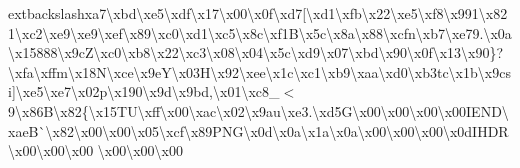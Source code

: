 \begin{DoxyCompactItemize}
extbackslash{}xa7\textbackslash{}xbd\textbackslash{}xe5\textbackslash{}xdf\textbackslash{}x17\textbackslash{}x00\textbackslash{}x0f\textbackslash{}xd7\mbox{[}\textbackslash{}xd1\textbackslash{}xfb\textbackslash{}x22\textbackslash{}xe5\textbackslash{}xf8\textbackslash{}x991\textbackslash{}x821\textbackslash{}xc2\textbackslash{}xe9\textbackslash{}xe9\textbackslash{}xef\textbackslash{}x89\textbackslash{}xc0\textbackslash{}xd1\textbackslash{}xc5\textbackslash{}x8c\textbackslash{}xf1\+B\textbackslash{}x5c\textbackslash{}x8a\textbackslash{}x88\textbackslash{}xcfn\textbackslash{}xb7\textbackslash{}xe79.\textbackslash{}x0a\textbackslash{}x15888\textbackslash{}x9c\+Z\textbackslash{}xc0\textbackslash{}xb8\textbackslash{}x22\textbackslash{}xc3\textbackslash{}x08\textbackslash{}x04\textbackslash{}x5c\textbackslash{}xd9\textbackslash{}x07\textbackslash{}xbd\textbackslash{}x90\textbackslash{}x0f\textbackslash{}x13\textbackslash{}x90\}?\textbackslash{}xfa\textbackslash{}xffm\textbackslash{}x18\+N\textbackslash{}xce\textbackslash{}x9e\+Y\textbackslash{}x03\+H\textbackslash{}x92\textbackslash{}xee\textbackslash{}x1c\textbackslash{}xc1\textbackslash{}xb9\textbackslash{}xaa\textbackslash{}xd0\textbackslash{}xb3tc\textbackslash{}x1b\textbackslash{}x9csi\mbox{]}\textbackslash{}xe5\textbackslash{}xe7\textbackslash{}x02p\textbackslash{}x190\textbackslash{}x9d\textbackslash{}x9bd,\textbackslash{}x01\textbackslash{}xc8\+\_\+$<$9\textbackslash{}x86\+B\textbackslash{}x82\{\textbackslash{}x15\+T\+U\textbackslash{}xff\textbackslash{}x00\textbackslash{}xac\textbackslash{}x02\textbackslash{}x9au\textbackslash{}xe3.\textbackslash{}xd5\+G\textbackslash{}x00\textbackslash{}x00\textbackslash{}x00\textbackslash{}x00\+I\+E\+N\+D\textbackslash{}xae\+B\`{}\textbackslash{}x82\textbackslash{}x00\textbackslash{}x00\textbackslash{}x05\textbackslash{}xcf\textbackslash{}x89\+P\+N\+G\textbackslash{}x0d\textbackslash{}x0a\textbackslash{}x1a\textbackslash{}x0a\textbackslash{}x00\textbackslash{}x00\textbackslash{}x00\textbackslash{}x0d\+I\+H\+D\+R\textbackslash{}x00\textbackslash{}x00\textbackslash{}x00 \textbackslash{}x00\textbackslash{}x00\textbackslash{}x00 
\end{DoxyCompactItemize}

